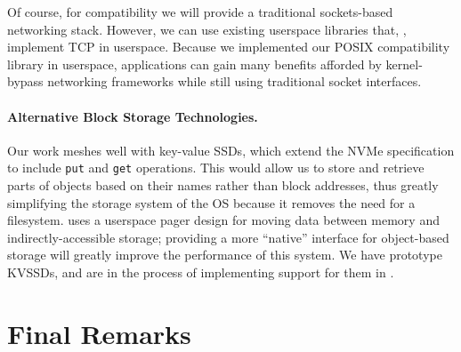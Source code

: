 {    Of course, for compatibility we will provide a traditional sockets-based networking stack. However,
    we can use existing userspace libraries that, \eg, implement TCP in userspace.
    Because we implemented our POSIX compatibility library in userspace, applications can gain many
    benefits afforded by kernel-bypass networking frameworks while still using traditional socket
    interfaces.


    \paragraph{Alternative Block Storage Technologies.}

    Our work meshes well with key-value SSDs, which extend the NVMe
    specification to include \texttt{put} and \texttt{get} operations. This would allow us to store and
    retrieve parts of objects based on their names rather than block addresses, thus greatly
    simplifying the storage system of the OS because it removes the need for a filesystem. \Twizzler
    uses a userspace pager design for moving data between memory and indirectly-accessible storage;
    providing a more ``native'' interface for object-based storage will greatly improve the performance
    of this system. We have prototype KVSSDs, and are in the process of implementing support for them in
    \Twizzler.

}


\section{Final Remarks}